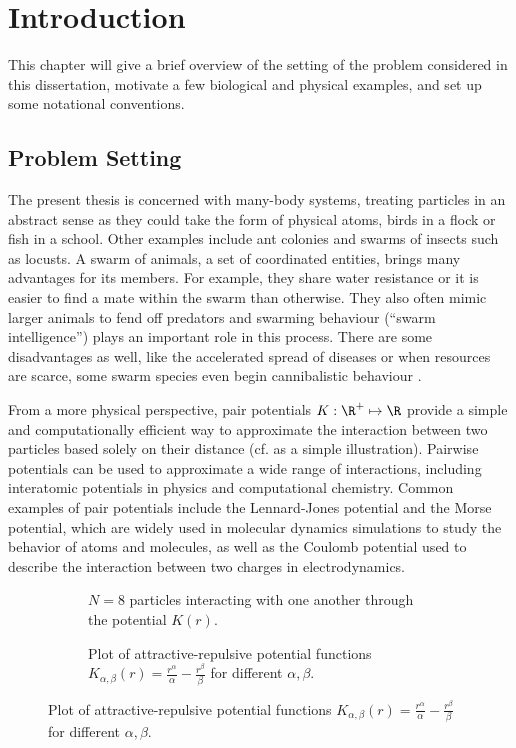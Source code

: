 \chapter{Introduction}
\label{chap:introduction}

This chapter will give a brief overview of the setting of the problem considered in this dissertation, motivate a few biological and physical examples, and set up some notational conventions.

\section{Problem Setting}
The present thesis is concerned with many-body systems, treating particles in an abstract sense as they could take the form of physical atoms, birds in a flock or fish in a school.
Other examples include ant colonies and swarms of insects such as locusts.
A swarm of animals, a set of coordinated entities, brings many advantages for its members.
For example, they share water resistance or it is easier to find a mate within the swarm than otherwise.
They also often mimic larger animals to fend off predators and swarming behaviour (``swarm intelligence'') plays an important role in this process.
There are some disadvantages as well, like the accelerated spread of diseases or when resources are scarce, some swarm species even begin cannibalistic behaviour \parencite{2017-maria-orsogna-swarm-video}.

From a more physical perspective, pair potentials $K: \R^+ \mapsto \R$ provide a simple and computationally efficient way to approximate the interaction between two particles based solely on their distance (cf.  as a simple illustration).
Pairwise potentials can be used to approximate a wide range of interactions, including interatomic potentials in physics and computational chemistry.
Common examples of pair potentials include the Lennard-Jones potential and the Morse potential, which are widely used in molecular dynamics simulations to study the behavior of atoms and molecules, as well as the Coulomb potential used to describe the interaction between two charges in electrodynamics.

\begin{figure}[H]
  \centering
  \begin{subfigure}[t]{0.47\textwidth}
    \centering
    \caption[]{$N = 8$ particles interacting with one another through the potential $K(r)$.}
    \label{fig:problem-setting}
  \end{subfigure}
  \hfill
  \begin{subfigure}[t]{0.47\textwidth}
    \centering
    \caption[]{Plot of attractive-repulsive potential functions $K_{\alpha, \beta}(r) = \frac{r^\alpha}{\alpha} - \frac{r^\beta}{\beta}$ for different $\alpha, \beta$.}
    \label{fig:potential-function}
  \end{subfigure}
\end{figure}

